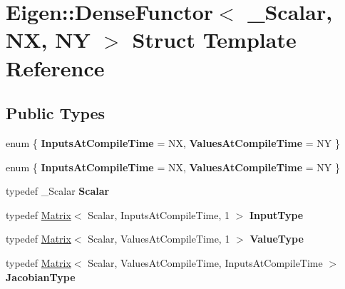 \hypertarget{struct_eigen_1_1_dense_functor}{}\section{Eigen\+:\+:Dense\+Functor$<$ \+\_\+\+Scalar, NX, NY $>$ Struct Template Reference}
\label{struct_eigen_1_1_dense_functor}
\subsection*{Public Types}
\begin{DoxyCompactItemize}
\item 
\mbox{\label{struct_eigen_1_1_dense_functor_ae0d1accda1816ba6f994933784474ab9}} 
enum \{ {\bfseries Inputs\+At\+Compile\+Time} = NX, 
{\bfseries Values\+At\+Compile\+Time} = NY
 \}
\item 
\mbox{\label{struct_eigen_1_1_dense_functor_a8e566d5494d55d9752b2a10ea3c20e73}} 
enum \{ {\bfseries Inputs\+At\+Compile\+Time} = NX, 
{\bfseries Values\+At\+Compile\+Time} = NY
 \}
\item 
\mbox{\label{struct_eigen_1_1_dense_functor_a8a443f2cd4c4b4d87efd8d2e5e6a7f13}} 
typedef \+\_\+\+Scalar {\bfseries Scalar}
\item 
\mbox{\label{struct_eigen_1_1_dense_functor_a46f643404e97345f6b7b65aaa611bcd1}} 
typedef \hyperlink{group___core___module_class_eigen_1_1_matrix}{Matrix}$<$ Scalar, Inputs\+At\+Compile\+Time, 1 $>$ {\bfseries Input\+Type}
\item 
\mbox{\label{struct_eigen_1_1_dense_functor_a9ea73a4caee5265cbae45c2692900383}} 
typedef \hyperlink{group___core___module_class_eigen_1_1_matrix}{Matrix}$<$ Scalar, Values\+At\+Compile\+Time, 1 $>$ {\bfseries Value\+Type}
\item 
\mbox{\label{struct_eigen_1_1_dense_functor_a01a6ac8a8bf00b999a06b0f898edc3b7}} 
typedef \hyperlink{group___core___module_class_eigen_1_1_matrix}{Matrix}$<$ Scalar, Values\+At\+Compile\+Time, Inputs\+At\+Compile\+Time $>$ {\bfseries Jacobian\+Type}

\end{DoxyCompactItemize}
